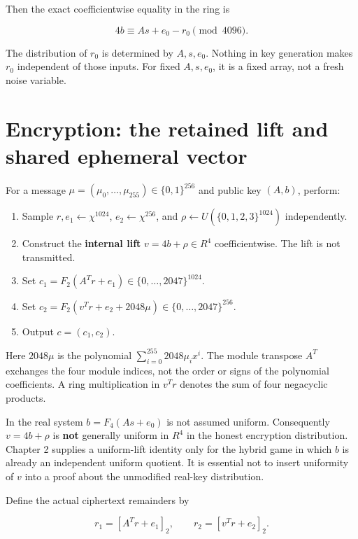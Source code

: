 \documentclass[
  11pt,
  a4paper,
  oneside]{report}
\providecommand{\tightlist}{%
  \setlength{\itemsep}{0pt}\setlength{\parskip}{0pt}}
\begin{document}
Then the exact coefficientwise equality in the ring is

\[
4b\equiv As+e_0-r_0\pmod{4096}.
\]

The distribution of \(r_0\) is determined by \(A,s,e_0\). Nothing in key
generation makes \(r_0\) independent of those inputs. For fixed
\(A,s,e_0\), it is a fixed array, not a fresh noise variable.

\section{Encryption: the retained lift and shared ephemeral
vector}\label{encryption-the-retained-lift-and-shared-ephemeral-vector}

For a message \(\mu=(\mu_0,\ldots,\mu_{255})\in\{0,1\}^{256}\) and
public key \((A,b)\), perform:

\begin{enumerate}
\def\labelenumi{\arabic{enumi}.}
\tightlist
\item
  Sample \(r,e_1\leftarrow\chi^{1024}\), \(e_2\leftarrow\chi^{256}\),
  and \(\rho\leftarrow U(\{0,1,2,3\}^{1024})\) independently.
\item
  Construct the \textbf{internal lift} \(v=4b+\rho\in R^4\)
  coefficientwise. The lift is not transmitted.
\item
  Set \(c_1=F_2(A^Tr+e_1)\in\{0,\ldots,2047\}^{1024}\).
\item
  Set \(c_2=F_2(v^Tr+e_2+2048\mu)\in\{0,\ldots,2047\}^{256}\).
\item
  Output \(c=(c_1,c_2)\).
\end{enumerate}

Here \(2048\mu\) is the polynomial \(\sum_{i=0}^{255}2048\mu_i x^i\).
The module transpose \(A^T\) exchanges the four module indices, not the
order or signs of the polynomial coefficients. A ring multiplication in
\(v^Tr\) denotes the sum of four negacyclic products.

In the real system \(b=F_4(As+e_0)\) is not assumed uniform.
Consequently \(v=4b+\rho\) is \textbf{not} generally uniform in \(R^4\)
in the honest encryption distribution. Chapter 2 supplies a uniform-lift
identity only for the hybrid game in which \(b\) is already an
independent uniform quotient. It is essential not to insert uniformity
of \(v\) into a proof about the unmodified real-key distribution.

Define the actual ciphertext remainders by

\[
r_1=[A^Tr+e_1]_2,\qquad
r_2=[v^Tr+e_2]_2.
\]
\end{document}
